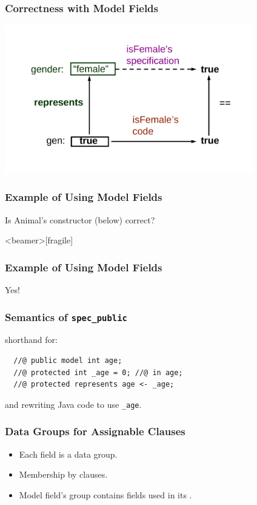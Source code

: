 \begin{frame}
\frametitle{Correctness with Model Fields}
\includegraphics[width=4.25in]{model-correctness}
\end{frame}

\begin{frame}[fragile]
\frametitle{Example of Using Model Fields}
\begin{question}
Is Animal's constructor (below) correct?
\rm

\end{question}
\end{frame}

\begin{frame}<beamer>[fragile]
\frametitle{Example of Using Model Fields}

\alert{Yes!}



\end{frame}

\begin{frame}[fragile]
\frametitle{Semantics of \lstinline!spec_public!}


shorthand for:

\begin{lstlisting}
  //@ public model int age;
  //@ protected int _age = 0; //@ in age;
  //@ protected represents age <- _age; 
\end{lstlisting}

and rewriting Java code to use \lstinline!_age!.

\end{frame}

\begin{frame}
\frametitle{Data Groups for Assignable Clauses}
\begin{itemize}
\item
Each field is a data group.

\item
Membership by  clauses.

\item
Model field's group contains
fields used in its .
\end{itemize}
\end{frame}

